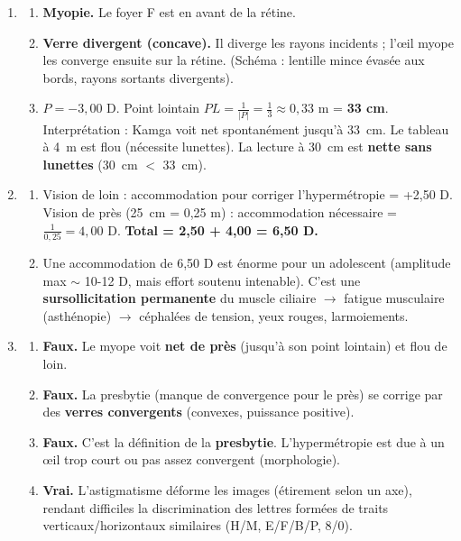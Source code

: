 \documentclass[11pt]{article}
\begin{document}
\begin{corrige}
\begin{enumerate}
    \item \begin{enumerate}
        \item \textbf{Myopie.} Le foyer F est en avant de la rétine.
        \item \textbf{Verre divergent (concave).} Il diverge les rayons incidents ; l'œil myope les converge ensuite sur la rétine. (Schéma : lentille mince évasée aux bords, rayons sortants divergents).
        \item $P = -3,00$ D. Point lointain $PL = \frac{1}{|P|} = \frac{1}{3} \approx 0,33$ m = \textbf{33 cm}. Interprétation : Kamga voit net spontanément jusqu'à \SI{33}{cm}. Le tableau à \SI{4}{m} est flou (nécessite lunettes). La lecture à \SI{30}{cm} est \textbf{nette sans lunettes} (\SI{30}{cm} $<$ \SI{33}{cm}).
    \end{enumerate}
    \item \begin{enumerate}
        \item Vision de loin : accommodation pour corriger l'hypermétropie = +2,50 D. Vision de près (\SI{25}{cm} = 0,25 m) : accommodation nécessaire = $\frac{1}{0,25} = 4,00$ D. \textbf{Total = 2,50 + 4,00 = 6,50 D.}
        \item Une accommodation de 6,50 D est énorme pour un adolescent (amplitude max $\sim$ 10-12 D, mais effort soutenu intenable). C'est une \textbf{sursollicitation permanente} du muscle ciliaire $\rightarrow$ fatigue musculaire (asthénopie) $\rightarrow$ céphalées de tension, yeux rouges, larmoiements.
    \end{enumerate}
    \item \begin{enumerate}
        \item \textbf{Faux.} Le myope voit \textbf{net de près} (jusqu'à son point lointain) et flou de loin.
        \item \textbf{Faux.} La presbytie (manque de convergence pour le près) se corrige par des \textbf{verres convergents} (convexes, puissance positive).
        \item \textbf{Faux.} C'est la définition de la \textbf{presbytie}. L'hypermétropie est due à un œil trop court ou pas assez convergent (morphologie).
        \item \textbf{Vrai.} L'astigmatisme déforme les images (étirement selon un axe), rendant difficiles la discrimination des lettres formées de traits verticaux/horizontaux similaires (H/M, E/F/B/P, 8/0).
    \end{enumerate}
\end{enumerate}
\end{corrige}
\end{document}
